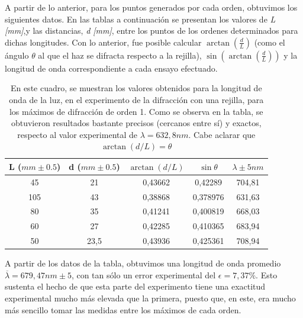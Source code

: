\documentclass[%
 reprint,
 amsmath,amssymb,
 aps,
]{revtex4-1}
\begin{document}
A partir de lo anterior, para los puntos generados por cada orden, obtuvimos los siguientes datos. En las tablas a continuación se presentan los valores de \textit{L [mm]},y las distancias, \textit{d [mm]}, entre los puntos de los ordenes determinados para dichas longitudes. Con lo anterior, fue posible calcular $\arctan(\frac{d}{L})$ (como el ángulo $\theta$ al que el haz se difracta respecto a la rejilla), $\sin{(\arctan(\frac{d}{L}))}$ y la longitud de onda correspondiente a cada ensayo efectuado. 

\begin{table}[H]
\begin{tabular}{|c|c|c|c|c|} \hline
\label{tabla1s}
L ($mm \pm 0.5$) & d ($mm \pm 0.5$)    & $\arctan(d/L)$      & $\sin{\theta}$        & $\lambda \pm 5 nm$      \\ \hline
45     & 21   & 0,43662  & 0,42289 & 704,81 \\ \hline
105    & 43   & 0,38868 & 0,378976 & 631,63 \\ \hline
80     & 35   & 0,41241 & 0,400819 & 668,03   \\ \hline
60     & 27   & 0,42285 & 0,410365 & 683,94 \\ \hline
50     & 23,5 & 0,43936 & 0,425361  & 708,94 \\ \hline
\end{tabular}  
\caption{En este cuadro, se muestran los valores obtenidos para la longitud de onda de la luz, en el experimento de la difracción con una rejilla, para los máximos de difracción de orden 1. Como se observa en la tabla, se obtuvieron resultados bastante precisos (cercanos entre sí) y exactos, respecto al valor experimental de $\lambda = 632,8 nm$. Cabe aclarar que $\arctan(d/L) = \theta$}
\end{table}

A partir de los datos de la tabla, obtuvimos una longitud de onda promedio $\overline{\lambda} = 679,47 nm \pm 5$, con tan sólo un error experimental del $\epsilon = 7,37\%$. Esto sustenta el hecho de que esta parte del experimento tiene una exactitud experimental mucho más elevada que la primera, puesto que, en este, era mucho más sencillo tomar las medidas entre los máximos de cada orden.   
\end{document}
